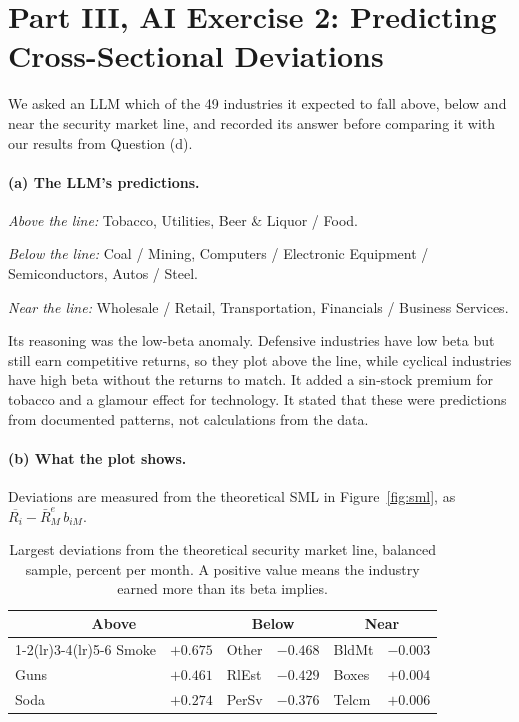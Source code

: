 \section{Part III, AI Exercise 2: Predicting Cross-Sectional Deviations}

We asked an LLM which of the 49 industries it expected to fall above, below and
near the security market line, and recorded its answer before comparing it with
our results from Question (d).

\paragraph{(a) The LLM's predictions.}
\begin{tight}
\item \textit{Above the line:} Tobacco, Utilities, Beer \& Liquor / Food.
\item \textit{Below the line:} Coal / Mining, Computers / Electronic Equipment
/ Semiconductors, Autos / Steel.
\item \textit{Near the line:} Wholesale / Retail, Transportation, Financials /
Business Services.
\end{tight}

Its reasoning was the low-beta anomaly. Defensive industries have low beta but
still earn competitive returns, so they plot above the line, while cyclical
industries have high beta without the returns to match. It added a sin-stock
premium for tobacco and a glamour effect for technology. It stated that these
were predictions from documented patterns, not calculations from the data.

\paragraph{(b) What the plot shows.} Deviations are measured from the
theoretical SML in Figure~\ref{fig:sml}, as
$\overline{R_i} - \bar{R}_M^{e}\,b_{iM}$.

\begin{table}[H]
\centering
\caption{Largest deviations from the theoretical security market line, balanced
sample, percent per month. A positive value means the industry earned more than
its beta implies.}
\small
\begin{tabular}{lrlrlr}
\toprule
\multicolumn{2}{c}{Above} & \multicolumn{2}{c}{Below}
& \multicolumn{2}{c}{Near} \\
\cmidrule(lr){1-2}\cmidrule(lr){3-4}\cmidrule(lr){5-6}
Smoke & $+0.675$ & Other & $-0.468$ & BldMt & $-0.003$ \\
Guns  & $+0.461$ & RlEst & $-0.429$ & Boxes & $+0.004$ \\
Soda  & $+0.274$ & PerSv & $-0.376$ & Telcm & $+0.006$ \\
\bottomrule
\end{tabular}
\label{tab:dev}
\end{table}

